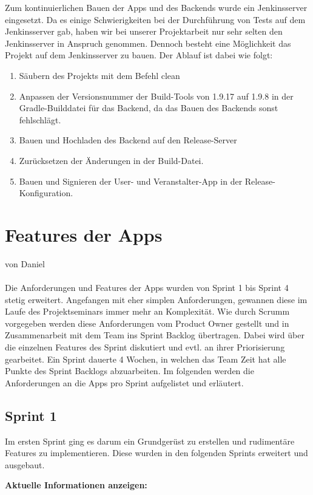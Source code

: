 \documentclass[a4paper, titlepage]{scrartcl}
\newcommand{\AUTHOR}[1]{
	von #1 \\ \\
}
\begin{document}
Zum kontinuierlichen Bauen der Apps und des Backends wurde ein Jenkinsserver eingesetzt. Da es einige Schwierigkeiten bei der Durchführung von Tests auf dem Jenkinsserver gab, haben wir bei unserer Projektarbeit nur sehr selten den Jenkinsserver in Anspruch genommen. Dennoch besteht eine Möglichkeit das Projekt auf dem Jenkinsserver zu bauen. Der Ablauf ist dabei wie folgt:

\begin{enumerate}
	\item Säubern des Projekts mit dem Befehl \glqq clean\grqq
	\item Anpassen der Versionsnummer der Build-Tools von 1.9.17 auf 1.9.8 in der Gradle-Builddatei für das Backend, da das Bauen des Backends sonst fehlschlägt.
	\item Bauen und Hochladen des Backend auf den Release-Server
	\item Zurücksetzen der Änderungen in der Build-Datei.
	\item Bauen und Signieren der User- und Veranstalter-App in der Release-Konfiguration.
\end{enumerate}

\section{Features der Apps}
\AUTHOR{Daniel}

Die Anforderungen und Features der Apps wurden von Sprint 1 bis Sprint 4 stetig erweitert. Angefangen mit eher simplen Anforderungen, gewannen diese im Laufe des Projektseminars immer mehr an Komplexität. Wie durch Scrumm vorgegeben werden diese Anforderungen vom Product Owner gestellt und in Zusammenarbeit mit dem Team ins Sprint Backlog übertragen. Dabei wird über die einzelnen Features des Sprint diskutiert und evtl. an ihrer Priorisierung gearbeitet. Ein Sprint dauerte 4 Wochen, in welchen das Team Zeit hat alle Punkte des Sprint Backlogs abzuarbeiten. Im folgenden werden die Anforderungen an die Apps pro Sprint aufgelistet und erläutert.

\subsection{Sprint 1}
Im ersten Sprint ging es darum ein Grundgerüst zu erstellen und rudimentäre Features zu implementieren. Diese wurden in den folgenden Sprints erweitert und ausgebaut.

\textbf{Aktuelle Informationen anzeigen:}
\end{document}
